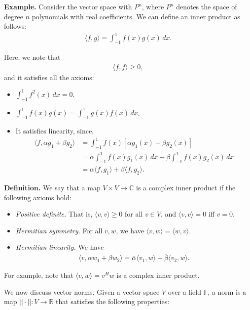 \documentclass{article}
\newcommand{\RR}{\mathbb{R}}
\newcommand{\CC}{\mathbb{C}}
\newcommand{\ol}{\overline}
\begin{document}
{\bf Example.} Consider the vector space with $P^n$, where $P^n$ denotes the space of degree $n$ polynomials with real coefficients.  We can define an inner product as follows:
\begin{align*}
  \langle f, g\rangle = \int_{-1}^{1} f(x) g(x) \, dx.
\end{align*}

Here, we note that
\begin{align*}
  \langle f, f\rangle \geq 0,
\end{align*}
and it satisfies all the axioms:
\begin{itemize}
  \item $\int_{-1}^{1} f^2(x) \, dx = 0$.
  \item $\int_{-1}^{1} f(x) g(x) = \int_{-1}^{1} g(x) f(x) \, dx$.
  \item It satisfies linearity, since, 
    \begin{align*}
      \langle f, \alpha g_1 + \beta g_2\rangle &= \int_{-1}^{1} f(x) \left[ \alpha g_1(x) + \beta g_2(x) \right] \\
      &= \alpha \int_{-1}^{1} f(x) g_1(x) \, dx + \beta \int_{-1}^{1} f(x) g_2(x) \, dx \\
      &= \alpha \langle f, g_1\rangle + \beta \langle f, g_2\rangle.
    \end{align*}
\end{itemize}

{\bf Definition.} We say that a map $V \times V \to \CC$ is a complex inner product if the following axioms hold:

\begin{itemize}
  \item {\it Positive definite.} That is, $\langle v, v\rangle \geq 0$ for all $v \in V$, and $\langle v, v \rangle = 0$ iff $v = 0$.
  \item {\it Hermitian symmetry.}  For all $v, w$, we have $\langle v, w\rangle = \langle w, v\rangle$.
  \item {\it Hermitian linearity.} We have
    \begin{align*}
      \langle v, \alpha w_1 + \beta w_2 \rangle = \ol{\alpha} \langle v_1, w\rangle + \ol{\beta} \langle v_2, w\rangle.
    \end{align*}
\end{itemize}

For example, note that $\langle v, w\rangle = v^H w$ is a complex inner product.

We now discuss vector norms.  Given a vector space $V$ over a field $\mathbb{F}$, a norm is a map $|| \cdot || : V \to \RR$ that satisfies the following properties:
\end{document}
